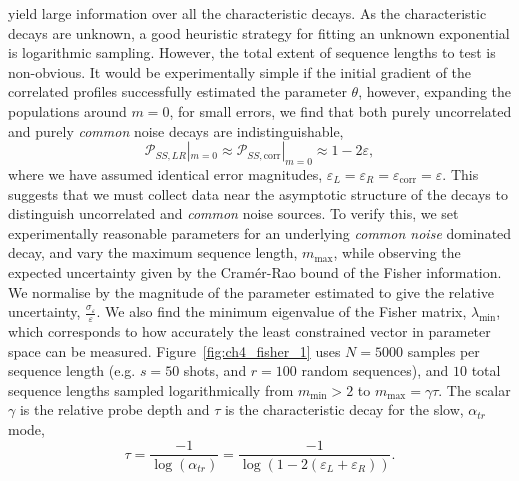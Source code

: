 yield large information over all the characteristic decays. As the
characteristic decays are unknown, a good heuristic strategy for fitting an
unknown exponential is logarithmic sampling. However,
the total extent of sequence lengths to test is non-obvious. It would be
experimentally simple if the initial gradient of the correlated profiles
successfully estimated the parameter $\theta$, however, expanding the populations around $m=0$, for small errors, we find that both 
purely uncorrelated and purely \emph{common} noise decays 
are indistinguishable,
\begin{equation}
    \mathcal{P}_{SS,LR}|_{m=0}\approx\mathcal{P}_{SS,\mathrm{corr}}|_{m=0}\approx 1-2\varepsilon,
\end{equation}
where we have assumed identical error
magnitudes, $\varepsilon_L=\varepsilon_R=\varepsilon_\mathrm{corr}=\varepsilon$. This suggests that we must collect data near the asymptotic structure of the decays to distinguish uncorrelated and \emph{common} noise sources. To verify this, we set experimentally reasonable parameters for an underlying \emph{common noise} dominated decay, and vary the maximum sequence length, $m_\mathrm{max}$, while observing the expected uncertainty given by the Cram\'er-Rao bound of the Fisher information. We normalise by the magnitude of the parameter estimated to give the relative uncertainty, $\frac{\sigma_\varepsilon}{\varepsilon}$. We also find the minimum eigenvalue of the Fisher matrix, $\lambda_\mathrm{min}$, which corresponds to how accurately the least constrained vector in parameter space can be measured. Figure~\ref{fig:ch4_fisher_1} uses $N=5000$ samples per sequence length (e.g. $s=50$ shots, and $r=100$ random sequences), and $10$ total sequence lengths sampled logarithmically from $m_\mathrm{min}>2$ to $m_\mathrm{max}=\gamma\tau$. The scalar $\gamma$ is the relative probe depth and $\tau$ is the characteristic decay for the slow, $\alpha_{tr}$ mode,
\begin{equation}
    \tau = \frac{-1}{\log(\alpha_{tr})} = \frac{-1}{\log(1-2(\varepsilon_L+\varepsilon_R))}.
\end{equation}
